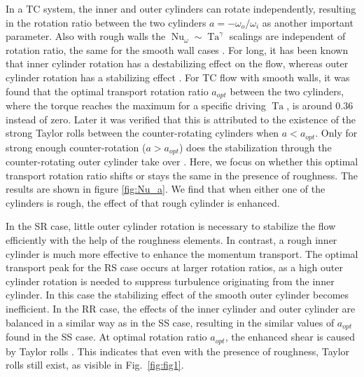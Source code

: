 \documentclass[aps,prl,superscriptaddress,preprint]{revtex4}
\newcommand{\Ta}{\operatorname{Ta}}
\newcommand{\Nu}{\operatorname{Nu}_{\omega}}
\begin{document}
In a TC system, the inner and outer cylinders can rotate independently, resulting in the rotation ratio between the two cylinders $a=-\omega_o/\omega_i$ as another important parameter. 
Also with rough walls the $\Nu \sim \Ta^{\gamma}$ scalings are independent of rotation ratio, the same for the smooth wall cases \cite{gil11}. For long, it has been known that inner cylinder rotation has a destabilizing effect on the flow, whereas outer cylinder rotation has a stabilizing effect \cite{tay23b}. For TC flow with smooth walls, it was found that the optimal transport rotation ratio $a_{opt}$ between the two cylinders, where the torque reaches the maximum for a specific driving $\Ta$, is around 0.36 \cite{hui14,vee16b} instead of zero. Later it was verified that this is attributed to the existence of the strong Taylor rolls between the counter-rotating cylinders when $a<a_{opt}$. Only for strong enough counter-rotation ($a>a_{opt}$) does the stabilization through the counter-rotating outer cylinder take over \cite{gil12}. Here, we focus on whether this optimal transport rotation ratio shifts or stays the same in the presence of roughness. The results are shown in figure \ref{fig:Nu_a}. 
We find that when either one of the cylinders is rough, the effect of that rough cylinder is enhanced. 

In the SR case, little outer cylinder rotation is necessary to stabilize the flow efficiently with the help of the roughness elements. In contrast, a rough inner cylinder is much more effective to enhance the momentum transport. The optimal transport peak for the RS case occurs at larger rotation ratios, as a high outer cylinder rotation is needed to suppress turbulence originating from the inner cylinder. In this case the stabilizing effect of the smooth outer cylinder becomes inefficient. 
In the RR case, the effects of the inner cylinder and outer cylinder are balanced in a similar way as in the SS case, resulting in the similar values of $a_{opt}$ found in the SS case. At optimal rotation ratio $a_{opt}$, the enhanced shear is caused by Taylor rolls \cite{hui14,ost14pd,mar14,vee16b}. This indicates that even with the presence of roughness, Taylor rolls still exist, as visible in Fig.\ \ref{fig:fig1}.
\end{document}
